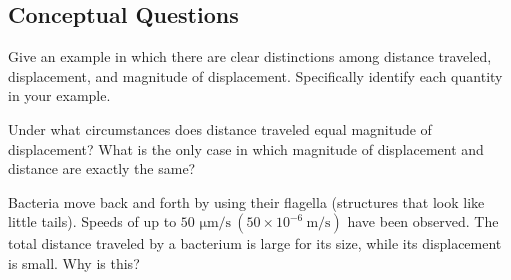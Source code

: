 \documentclass[
]{book}
\newenvironment{conceptual-questions}{}{}
\begin{document}
\hypertarget{fs-id2075470}{}
\begin{conceptual-questions}

\hypertarget{conceptual-questions}{%
\subsection{Conceptual Questions}\label{conceptual-questions}}

\hypertarget{fs-id1704056}{}
\leavevmode\hypertarget{fs-id1942381}{}%
Give an example in which there are clear distinctions among distance
traveled, displacement, and magnitude of displacement. Specifically
identify each quantity in your example.

\hypertarget{fs-id3147584}{}
\leavevmode\hypertarget{fs-id1702540}{}%
Under what circumstances does distance traveled equal magnitude of
displacement? What is the only case in which magnitude of displacement
and distance are exactly the same?

\hypertarget{fs-id3563423}{}
\leavevmode\hypertarget{fs-id2781126}{}%
Bacteria move back and forth by using their flagella (structures that
look like little tails). Speeds of up to
\({\text{50\ μm/s}\ \left( {{\text{50} \times \text{10}^{- 6}}\ \text{m/s}} \right)}{}\)
have been observed. The total distance traveled by a bacterium is large
for its size, while its displacement is small. Why is this?

\end{conceptual-questions}
\end{document}
